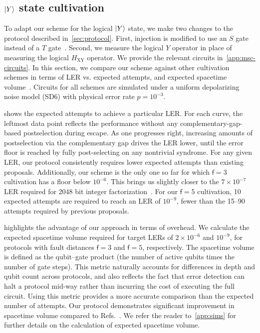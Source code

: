 \documentclass[%
    aps, 
    physrev,
    reprint,
]{revtex4-2}
\newcommand{\fd}[1]{\mathsf{f}=#1}
\newcommand{\XY}{_\mathrm{XY}}
\begin{document}
\subsection{\texorpdfstring{$\ket{Y}$}{Y} state cultivation}\label{sec:comparison}

To adapt our scheme for the logical $\ket{Y}$ state, we make two changes to the protocol described in~\cref{sec:protocol}. 
First, injection is modified to use an $S$ gate instead of a $T$ gate~\cite{gidney2019efficient,chen2025efficient}.
Second, we measure the logical $Y$ operator in place of measuring the logical $H\XY$ operator. 
We provide the relevant circuits in~\cref{app:msc-circuits}.
In this section, we compare our scheme against other cultivation schemes
in terms of LER vs. expected attempts,
and expected spacetime volume~\cite{gidney2024magic,chen2025efficient}. 
Circuits for all schemes are simulated under a uniform depolarizing noise model (SD6) with physical error rate $p = 10^{-3}$.

 shows the expected attempts to achieve a particular LER.
For each curve, the leftmost data point reflects the performance without any complementary-gap-based postselection during escape. 
As one progresses right, increasing amounts of postselection via the complementary gap drives the LER lower, until the error floor is reached by fully post-selecting on any nontrivial syndrome. 
For any given LER, our protocol consistently requires lower expected attempts than existing proposals.
Additionally, our scheme is the only one so far for which $\fd3$ cultivation has a floor below $10^{-6}$. 
This brings us slightly closer to the $7 \times 10^{-7}$ LER required for 2048 bit integer factorization~\cite{zhou_resource_2025}.
For our $\fd5$ cultivation, {10 expected attempts are required to} reach an LER of $10^{-9}$, fewer than the 15--90 attempts required by previous proposals. 
 
 highlights the advantage of our approach in terms of overhead.
We calculate the expected spacetime volume required for target LERs of $2\times 10^{-6}$ {and $10^{-9}$}, for protocols with fault distances $\fd3$ and $\fd5$, respectively.
The spacetime volume is defined as the qubit–gate product (the number of active qubits times the number of gate steps). 
This metric naturally accounts for differences in depth and qubit count across protocols, and also reflects the fact that error detection can halt a protocol mid-way rather than incurring the cost of executing the full circuit. 
Using this metric provides a more accurate comparison than the expected number of attempts.
Our protocol demonstrates significant improvement in spacetime volume compared to Refs.~\cite{gidney2024magic,chen2025efficient}. 
We refer the reader to~\cref{app:sims} for further details on the calculation of expected spacetime volume. 
\end{document}
